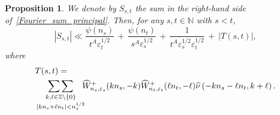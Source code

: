 \documentclass[12pt, reqno]{amsart}
\newtheorem{prop}[thm]{Proposition}
\theoremstyle{definition}
\theoremstyle{remark}
\numberwithin{equation}{section}
\newcommand{\N}{\mathbb{N}}
\newcommand{\what}[1]{\widehat{#1}}
\def\eps{\varepsilon}
\def\leq{\leqslant}
\begin{document}
\begin{prop}\label{prop_sum_S_m_n} We denote by $S_{s,t}$ the sum in the right-hand side of~\eqref{Fourier_sum_principal}.
Then, for any  $s,t \in \N$ with $s < t$,
\begin{equation} \label{S_bound}
|S_{s,t}| \ll
\frac{\psi(n_s)}{t^{A}\varepsilon_t^{1/2}}\, +\, 
\frac{\psi(n_t)}{s^{A}\varepsilon_s^{1/2}}
\, + \, \frac{1}{t^{A}\varepsilon_s^{1/2}
	\eps_t^{1/2}}   \,  +  \ |T(s,t)|,
\end{equation}
where 
\begin{align} \label{def_S_prime}
\notag &T(s,t) =  \\
&\mathop{ \mathop{\sum\sum}_{ k,\ell\in\mathbb{Z}\setminus \{0\} } }_{%
	|kn_s+\ell n_t|<n_s^{1/2}} \!\!\! \what{W}_{n_s,\varepsilon_s}^{+}(kn_s,-k)\what{W}_{n_t,\varepsilon_t}^{+}(\ell n_t,-\ell)  \what{\nu}\left( -kn_s-\ell n_t,k+\ell\right).
\end{align}
\end{prop}
\end{document}
